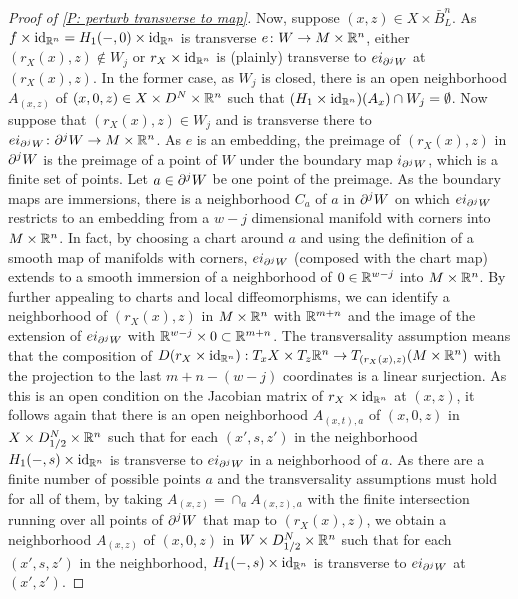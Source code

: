 \begin{proof}[Proof of \cref{P: perturb transverse to map}]
Now, suppose $(x,z) \in X \times \bar B^n_L$. As $f \times \mathrm{id}_{\mathbb{R}^n} = H_1(-,0) \times \mathrm{id}_{\mathbb{R}^n}$ is transverse $e \colon W \to M \times \mathbb{R}^n$, either $(r_X(x),z)\notin W_j$ or $r_X \times \mathrm{id}_{\mathbb{R}^n}$ is (plainly) transverse to $ei_{\partial^jW}$ at $(r_X(x),z)$. In the former case, as $W_j$ is closed, there is an open neighborhood $A_{(x,z)}$ of $(x,0,z) \in X \times D^N \times \mathbb{R}^n$ such that $(H_1 \times \mathrm{id}_{\mathbb{R}^n})(A_x) \cap W_j = \emptyset$. Now suppose that $(r_X(x),z) \in W_j$ and is transverse there to $ei_{\partial^jW} \colon \partial^jW \to M \times \mathbb{R}^n$. As $e$ is an embedding, the preimage of $(r_X(x),z)$ in $\partial^jW$ is the preimage of a point of $W$ under the boundary map $i_{\partial^jW}$, which is a finite set of points. Let $a \in \partial^jW$ be one point of the preimage. As the boundary maps are immersions, there is a neighborhood $C_a$ of $a$ in $\partial^jW$ on which $ei_{\partial^jW}$ restricts to an embedding from a $w-j$ dimensional manifold with corners into $M \times \mathbb{R}^n$. In fact, by choosing a chart around $a$ and using the definition of a smooth map of manifolds with corners, $ei_{\partial^jW}$ (composed with the chart map) extends to a smooth immersion of a neighborhood of $0 \in \mathbb{R}^{w-j}$ into $M \times \mathbb{R}^n$.
 By further appealing to charts and local diffeomorphisms, we can identify a neighborhood of $(r_X(x),z)$ in $M \times \mathbb{R}^n$ with $\mathbb{R}^{m+n}$ and the image of the extension of $ei_{\partial^jW}$ with $\mathbb{R}^{w-j} \times 0 \subset \mathbb{R}^{m+n}$.
 The transversality assumption means that the composition of $D(r_X \times \mathrm{id}_{\mathbb{R}^n}):T_xX \times T_z\mathbb{R}^n
 \to T_{(r_X(x),z)}(M \times \mathbb{R}^n)$ with the projection to the last $m+n-(w-j)$ coordinates is a linear surjection. As this is an open condition on the Jacobian matrix of $r_X \times \mathrm{id}_{\mathbb{R}^n}$ at $(x,z)$, it follows again that there is an open neighborhood $A_{(x,t),a}$ of $(x,0,z)$ in $X \times D_{1/2}^N \times \mathbb{R}^n$ such that for each $(x',s,z')$ in the neighborhood $H_1(-,s) \times \mathrm{id}_{\mathbb{R}^n}$ is transverse to $ei_{\partial^jW}$ in a neighborhood of $a$. As there are a finite number of possible points $a$ and the transversality assumptions must hold for all of them, by taking $A_{(x,z)} = \cap_a A_{(x,z),a}$ with the finite intersection running over all points of $\partial^jW$ that map to $(r_X(x),z)$, we obtain a neighborhood $A_{(x,z)}$ of $(x,0,z)$ in $W \times D_{1/2}^N \times \mathbb{R}^n$ such that for each $(x',s,z')$ in the neighborhood, $H_1(-,s) \times \mathrm{id}_{\mathbb{R}^n}$ is transverse to $ei_{\partial^jW}$ at $(x',z')$.


\end{proof}
